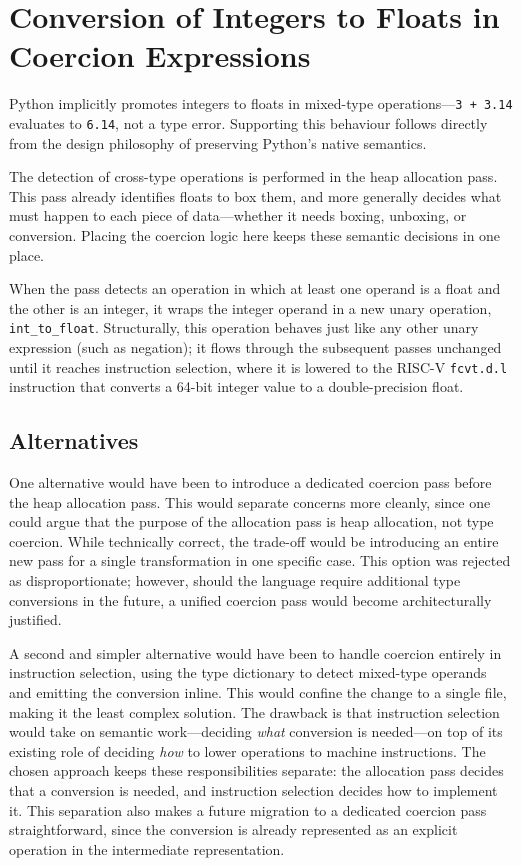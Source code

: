 \section{Conversion of Integers to Floats in Coercion Expressions}\label{sec:coercion}

Python implicitly promotes integers to floats in mixed-type operations---\texttt{3 + 3.14} evaluates to \texttt{6.14}, not a type error. Supporting this behaviour follows directly from the design philosophy of preserving Python's native semantics.

The detection of cross-type operations is performed in the heap allocation pass. This pass already identifies floats to box them, and more generally decides what must happen to each piece of data---whether it needs boxing, unboxing, or conversion. Placing the coercion logic here keeps these semantic decisions in one place.

When the pass detects an operation in which at least one operand is a float and the other is an integer, it wraps the integer operand in a new unary operation, \texttt{int\_to\_float}. Structurally, this operation behaves just like any other unary expression (such as negation); it flows through the subsequent passes unchanged until it reaches instruction selection, where it is lowered to the RISC-V \texttt{fcvt.d.l} instruction that converts a 64-bit integer value to a double-precision float.

\subsection{Alternatives}

One alternative would have been to introduce a dedicated coercion pass before the heap allocation pass. This would separate concerns more cleanly, since one could argue that the purpose of the allocation pass is heap allocation, not type coercion. While technically correct, the trade-off would be introducing an entire new pass for a single transformation in one specific case. This option was rejected as disproportionate; however, should the language require additional type conversions in the future, a unified coercion pass would become architecturally justified.

A second and simpler alternative would have been to handle coercion entirely in instruction selection, using the type dictionary to detect mixed-type operands and emitting the conversion inline. This would confine the change to a single file, making it the least complex solution. The drawback is that instruction selection would take on semantic work---deciding \emph{what} conversion is needed---on top of its existing role of deciding \emph{how} to lower operations to machine instructions. The chosen approach keeps these responsibilities separate: the allocation pass decides that a conversion is needed, and instruction selection decides how to implement it. This separation also makes a future migration to a dedicated coercion pass straightforward, since the conversion is already represented as an explicit operation in the intermediate representation.

